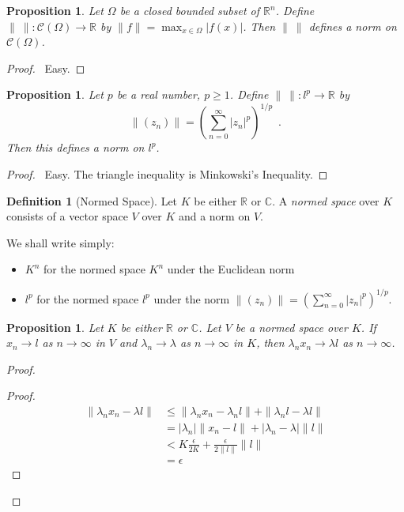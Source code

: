 \documentclass{book}
\let\qed\relax
\newtheorem{prop}[ax]{Proposition}
\theoremstyle{definition}
\newtheorem{df}[ax]{Definition}
\begin{document}
\begin{prop}
Let $\Omega$ be a closed bounded subset of $\mathbb{R}^n$. Define $\|\ \| : \mathcal{C}(\Omega) \rightarrow \mathbb{R}$ by $\| f \| = \max_{x \in \Omega} |f(x)|$. Then $\|\ \|$ defines a norm on $\mathcal{C}(\Omega)$.
\end{prop}

\begin{proof}
\pf\ Easy. \qed
\end{proof}

\begin{prop}
Let $p$ be a real number, $p \geq 1$. Define $\|\ \| : l^p \rightarrow \mathbb{R}$ by
\[ \| (z_n) \| = \left( \sum_{n=0}^\infty |z_n|^p \right)^{1/p} \enspace . \]
Then this defines a norm on $l^p$.
\end{prop}

\begin{proof}
\pf\ Easy. The triangle inequality is Minkowski's Inequality. \qed
\end{proof}

\begin{df}[Normed Space]
Let $K$ be either $\mathbb{R}$ or $\mathbb{C}$. A \emph{normed space} over $K$ consists of a vector space $V$ over $K$ and a norm on $V$.
\end{df}

We shall write simply:
\begin{itemize}
\item $K^n$ for the normed space $K^n$ under the Euclidean norm
\item $l^p$ for the normed space $l^p$ under the norm $\| (z_n) \| = \left( \sum_{n=0}^\infty |z_n|^p \right)^{1/p}$.
\end{itemize}

\begin{prop}
Let $K$ be either $\mathbb{R}$ or $\mathbb{C}$.
Let $V$ be a normed space over $K$. If $x_n \rightarrow l$ as $n \rightarrow \infty$ in $V$ and $\lambda_n \rightarrow \lambda$ as $n \rightarrow \infty$ in $K$, then $\lambda_n x_n \rightarrow \lambda l$ as $n \rightarrow \infty$.
\end{prop}

\begin{proof}
\pf
{}
\begin{proof}
	\pf
	\begin{align*}
		\| \lambda_n x_n - \lambda l \| & \leq \| \lambda_n x_n - \lambda_n l \| + \| \lambda_n l - \lambda l \| \\
		& = |\lambda_n| \| x_n - l \| + | \lambda_n - \lambda | \|l\| \\
		& < K \frac{\epsilon}{2K} + \frac{\epsilon}{2 \|l\|} \|l\| \\
		& = \epsilon
	\end{align*}
\end{proof}
\qed
\end{proof}
\end{document}
